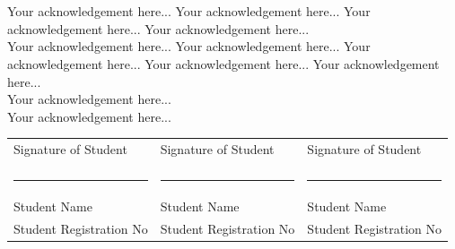 \clearpage
{}
{}
\chapter*{{\fontsize{14pt}{16.8pt}}} 

\vspace{-2em}
\noindent
\fontsize{12pt}{14.4pt}\selectfont 

\noindent 
Your acknowledgement here... Your acknowledgement here... Your acknowledgement here... Your acknowledgement here...\\

 
\noindent
Your acknowledgement here... Your acknowledgement here... Your acknowledgement here... Your acknowledgement here... Your acknowledgement here...\\

\noindent
Your acknowledgement here... \\

\noindent
Your acknowledgement here... \\


\vfill

\begin{table}[htb!]
\begin{tabular}{p{} p{} p{} }

Signature of Student & Signature of Student & Signature of Student \\

\vspace{6.5pt} & \vspace{6.5pt} & \vspace{6.5pt} \\

\hrule & \hrule & \hrule \\

Student Name & Student Name & Student Name \\
Student Registration No & 
Student Registration No & 
Student Registration No 
\end{tabular}
\end{table}

\newpage
